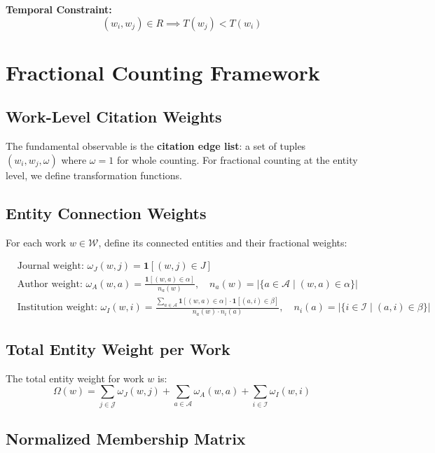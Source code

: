 \documentclass[12pt]{article}
\begin{document}
\noindent \textbf{Temporal Constraint:} 
\[
(w_i, w_j) \in R \implies T(w_j) < T(w_i)
\]

\section{Fractional Counting Framework}

\subsection{Work-Level Citation Weights}

The fundamental observable is the \textbf{citation edge list}: a set of tuples $(w_i, w_j, \omega)$ where $\omega = 1$ for whole counting. For fractional counting at the entity level, we define transformation functions.

\subsection{Entity Connection Weights}

For each work $w \in \mathcal{W}$, define its connected entities and their fractional weights:

\begin{align*}
	&\text{Journal weight: } \omega_J(w, j) = \mathbf{1}[(w, j) \in J] \\
	&\text{Author weight: } \omega_A(w, a) = \frac{\mathbf{1}[(w, a) \in \alpha]}{n_a(w)}, \quad n_a(w) = |\{a \in \mathcal{A} \mid (w, a) \in \alpha\}| \\
	&\text{Institution weight: } \omega_I(w, i) = \frac{\sum_{a \in \mathcal{A}} \mathbf{1}[(w, a) \in \alpha] \cdot \mathbf{1}[(a, i) \in \beta]}{n_a(w) \cdot n_i(a)}, \quad n_i(a) = |\{i \in \mathcal{I} \mid (a, i) \in \beta\}|
\end{align*}

\subsection{Total Entity Weight per Work}

The total entity weight for work $w$ is:
\[
\Omega(w) = \sum_{j \in \mathcal{J}} \omega_J(w, j) + \sum_{a \in \mathcal{A}} \omega_A(w, a) + \sum_{i \in \mathcal{I}} \omega_I(w, i)
\]

\subsection{Normalized Membership Matrix}
\end{document}
